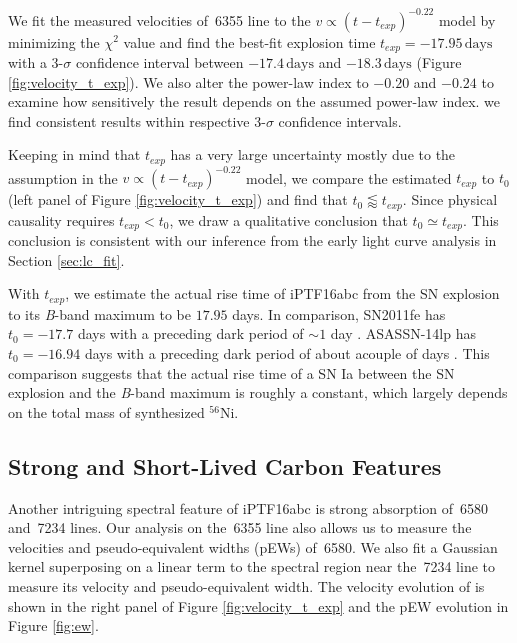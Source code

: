 \documentclass[twocolumn]{aastex61}
\begin{document}
We fit the measured velocities of \,6355 line to the
$v\propto(t-t_{exp})^{-0.22}$ model by minimizing the $\chi^2$ value
and find the best-fit explosion time $t_{exp}=-17.95\,\textrm{days}$
with a 3-$\sigma$ confidence interval between $-17.4\,\textrm{days}$
and $-18.3\,\textrm{days}$ (Figure \ref{fig:velocity_t_exp}). We also
alter the power-law index to $-0.20$ and $-0.24$ to examine how
sensitively the result depends on the assumed power-law index.  we
find consistent results within respective 3-$\sigma$ confidence
intervals.

Keeping in mind that $t_{exp}$ has a very large uncertainty mostly due
to the assumption in the $v\propto(t-t_{exp})^{-0.22}$ model, we
compare the estimated $t_{exp}$ to $t_0$ (left panel of Figure
\ref{fig:velocity_t_exp}) and find that $t_0\lessapprox t_{exp}$.
Since physical causality requires $t_{exp}<t_0$, we draw a qualitative
conclusion that $t_0\simeq t_{exp}$. This conclusion is consistent
with our inference from the early light curve analysis in Section
\ref{sec:lc_fit}.

With $t_{exp}$, we estimate the actual rise time of iPTF16abc from the
SN explosion to its \textit{B}-band maximum to be $17.95$ days.  In
comparison, SN2011fe has $t_0=-17.7$ days \citep{2013A&A...554A..27P}
with a preceding dark period of $\sim 1$ day
\citep{2014ApJ...784...85P}. ASASSN-14lp has $t_0=-16.94$ days with a
preceding dark period of about acouple of days
\citep{2016ApJ...826..144S}. This comparison suggests that the actual
rise time of a SN Ia between the SN explosion and the \textit{B}-band
maximum is roughly a constant, which largely depends on the total mass
of synthesized $^{56}$Ni. 

\subsection{Strong and Short-Lived Carbon Features}
\label{sec:carbon}

Another intriguing spectral feature of iPTF16abc is strong absorption of
\,6580 and \,7234 lines. Our analysis on the
\,6355 line also allows us to measure the velocities and
pseudo-equivalent widths (pEWs) of \,6580. We also fit a Gaussian
kernel superposing on a linear term to the spectral region near
the \,7234 line to measure its velocity and pseudo-equivalent
width. The velocity evolution of  is shown in the right panel
of Figure \ref{fig:velocity_t_exp} and the pEW evolution
in Figure \ref{fig:ew}. 
\end{document}
